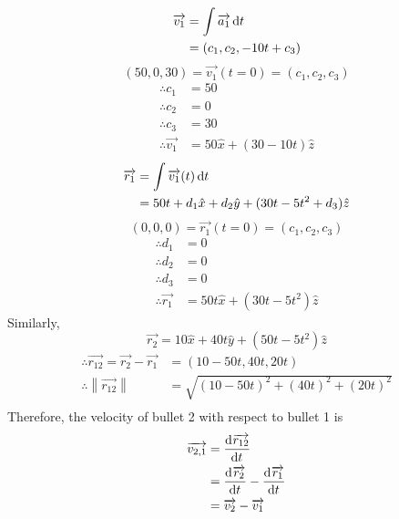 \documentclass[fleqn]{article}
\begin{document}
\begin{align*}
	\overrightarrow{v_1} &= \int \overrightarrow{a_1} \dif t\\
	&= (c_1, c_2, -10 t + c_3)
\end{align*}
\begin{equation*}
	(50, 0, 30) = \overrightarrow{v_1} (t=0) = (c_1, c_2, c_3) 
\end{equation*}
\begin{align*}
	\therefore c_1 &= 50 \\
	\therefore c_2 &= 0 \\
	\therefore c_3 &= 30 \\
	\therefore \overrightarrow{v_1} &= 50 \hat{x} + (30 - 10t) \hat{z}
\end{align*}
\begin{align*}
	\overrightarrow{r_1} &= \int \overrightarrow{v_1}(t) \dif t\\
	&= 50t + d_1 \hat{x} + d_2 \hat{y} + (30t - 5t^2 + d_3) \hat{z}
\end{align*}
\begin{equation*}
(0, 0, 0) = \overrightarrow{r_1} (t=0) = (c_1, c_2, c_3) 
\end{equation*}
\begin{align*}
	\therefore d_1 &= 0 \\
	\therefore d_2 &= 0 \\
	\therefore d_3 &= 0 \\
	\therefore \overrightarrow{r_1} &= 50t \hat{x} + (30t - 5t^2) \hat{z}
\end{align*}
Similarly,
\begin{equation*}
	\overrightarrow{r_2} = 10 \hat{x} + 40 t \hat{y} + (50t - 5t^2) \hat{z}
\end{equation*}
\begin{align*}
	\therefore \overrightarrow{r_{12}} = \overrightarrow{r_2} - \overrightarrow{r_1} &= (10 - 50t , 40t, 20t) \\
	\therefore \left\|\overrightarrow{r_{12}}\right\| &= \sqrt{(10 - 50t)^2 + (40t)^2 + (20t)^2}\\
\end{align*}
Therefore, the velocity of bullet 2 with respect to bullet 1 is
\begin{align*}
	\overrightarrow{v_{2,1}} &= \dod{\overrightarrow{r_{12}}}{t} \\
	&= \dod{\overrightarrow{r_2}}{t} - \dod{\overrightarrow{r_1}}{t} \\
	&= \overrightarrow{v_2} - \overrightarrow{v_1}
\end{align*}
\end{document}
